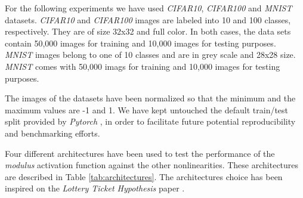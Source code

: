 For the following experiments we have used \textit{CIFAR10}, \textit{CIFAR100} \cite{krizhevsky09} and \textit{MNIST} \cite{lecun2010} datasets. \textit{CIFAR10} and \textit{CIFAR100} images are labeled into 10 and 100 classes, respectively. They are of size 32x32 and full color. In both cases, the data sets contain 50,000 images for training and 10,000 images for testing purposes. \textit{MNIST} images belong to one of 10 classes and are in grey scale and 28x28 size. \textit{MNIST} comes with 50,000 imags for training and 10,000 images for testing purposes.

The images of the datasets have been normalized so that the minimum and the maximum values are -1 and 1. We have kept untouched the default train/test split provided by \textit{Pytorch} \cite{Paszke2019}, in order to facilitate future potential reproducibility and benchmarking efforts. 

Four different architectures have been used to test the performance of the \textit{modulus} activation function against the other nonlinearities. These architectures are described in Table \ref{tab:architectures}. The architectures choice has been inspired on the \textit{Lottery Ticket Hypothesis} paper \cite{frankleC19}.





